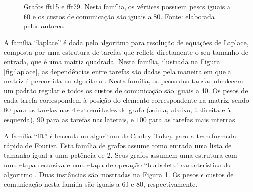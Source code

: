 \documentclass[fleqn,10pt]{SelfArx} %
\begin{document}
\begin{figure}
  \centering
  \caption{Grafos fft15 e fft39. Nesta família, os vértices  possuem pesos iguais a 60 e os custos de comunicação são iguais a 80. Fonte: elaborada pelos autores.}
  \label{fig:fft}
\end{figure}


A família ``laplace'' é dada pelo algoritmo para resolução de equações de Laplace, composta por uma estrutura de tarefas que reflete diretamente o seu tamanho de entrada, que é uma matriz quadrada. Nesta família, ilustrada na Figura \ref{fig:laplace}, as dependências entre tarefas são dadas pela maneira em que a matriz é percorrida no algoritmo \cite{hypertool}. Nesta família, os pesos das tarefas obedecem um padrão regular e todos os custos de comunicação são iguais a 40. Os pesos de cada tarefa correspondem à posição do elemento correspondente na matriz, sendo $80$ para as tarefas nas 4 extremidades do grafo (acima, abaixo, à direita e à esquerda), $90$ para as tarefas nas laterais, e $100$ para as tarefas mais internas.



A família ``fft'' é baseada no algoritmo de Cooley–Tukey para a transformada rápida de Fourier. Esta família de grafos assume como entrada uma lista de tamanho igual a uma potência de 2. Seus grafos assumem uma estrutura com uma etapa recursiva e uma etapa de operação ``borboleta'' característica do algoritmo \cite{fft}. Duas instâncias são mostradas na Figura \ref{fig:fft}. Os pesos e custos de comunicação nesta família são iguais a 60 e 80, respectivamente.
\end{document}
